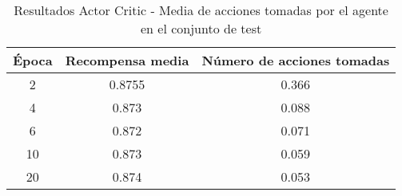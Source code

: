 \begin{table}[H]
\centering
\begin{tabular}{@{}ccc@{}}
\toprule
\textbf{Época} & \textbf{Recompensa media} & \textbf{Número de acciones tomadas}\\ \midrule
2             & 0.8755                  & 0.366                                                     \\ \midrule
4             & 0.873                  & 0.088                                                    \\ \midrule
6             & 0.872                  & 0.071                                                   \\ \midrule
10             & 0.873                  & 0.059                                                   \\ \midrule
20             & 0.874                  & 0.053                                                   \\ \bottomrule
\end{tabular}
\caption[Resultados Actor Critic - Media de acciones tomadas por el agente sobre el conjunto de test]{Resultados Actor Critic - Media de acciones tomadas por el agente en el conjunto de test}
\label{table-resultados-actor-critic-numero-movimientos-imagenes-test}
\end{table}
